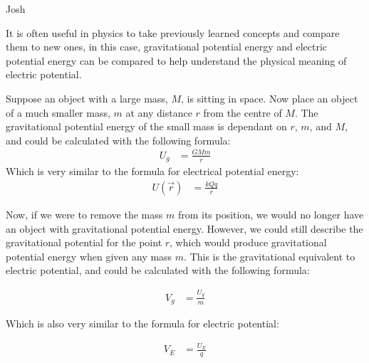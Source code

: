 \begin{studentOpinion}{Josh}
	
	It is often useful in physics to take previously learned concepts and compare them to new ones, in this case, gravitational potential energy and electric potential energy can be compared to help understand the physical meaning of electric potential. 
	
	Suppose an object with a large mass, $M$, is sitting in space. Now place an object of a much smaller mass, $m$ at any distance $r$ from the centre of $M$. The gravitational potential energy of the small mass is dependant on $r$, $m$, and $M$, and could be calculated with the following formula:
	\begin{align*}
	U_g&=\frac{GMm}{r}
	\end{align*}
	Which is very similar to the formula for electrical potential energy:
	\begin{align*}
	U(\vec r)&=\frac{kQq}{r}
	\end{align*}
	
	Now, if we were to remove the mass $m$ from its position, we would no longer have an object with gravitational potential energy. However, we could still describe the gravitational potential for the point $r$, which would produce gravitational potential energy when given any mass $m$. This is the gravitational equivalent to electric potential, and could be calculated with the following formula:
	
	\begin{align*}
	V_g&=\frac{U_g}{m}
	\end{align*}
	
	Which is also very similar to the formula for electric potential:
	
	\begin{align*}
	V_E&=\frac{U_E}{q}
	\end{align*}

	
		
\end{studentOpinion}

